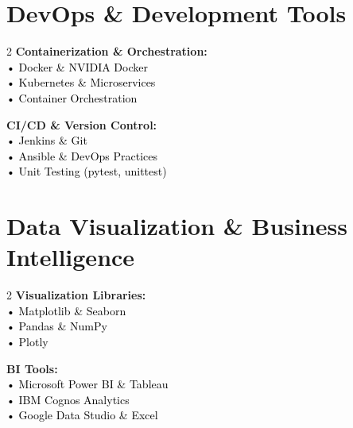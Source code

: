 \documentclass[10pt, letterpaper]{article}
\newcommand{\skillcat}[1]{%
    \textbf{\color{darkBlue}#1}%
}
\newcommand{\skillitem}[1]{%
    \textcolor{black}{#1}%
}
\begin{document}
\section{DevOps \& Development Tools}

\begin{tcolorbox}[colback=lightGray!50, colframe=accentColor, arc=3mm, boxrule=1pt]
\begin{multicols}{2}
\skillcat{Containerization \& Orchestration:} \\
\skillitem{• Docker \& NVIDIA Docker} \\
\skillitem{• Kubernetes \& Microservices} \\
\skillitem{• Container Orchestration} \\

\columnbreak

\skillcat{CI/CD \& Version Control:} \\
\skillitem{• Jenkins \& Git} \\
\skillitem{• Ansible \& DevOps Practices} \\
\skillitem{• Unit Testing (pytest, unittest)} \\
\end{multicols}
\end{tcolorbox}

\section{Data Visualization \& Business Intelligence}

\begin{tcolorbox}[colback=lightBlue!10, colframe=primaryColor, arc=3mm, boxrule=1pt]
\begin{multicols}{2}
\skillcat{Visualization Libraries:} \\
\skillitem{• Matplotlib \& Seaborn} \\
\skillitem{• Pandas \& NumPy} \\
\skillitem{• Plotly} \\

\columnbreak

\skillcat{BI Tools:} \\
\skillitem{• Microsoft Power BI \& Tableau} \\
\skillitem{• IBM Cognos Analytics} \\
\skillitem{• Google Data Studio \& Excel} \\
\end{multicols}
\end{tcolorbox}
\end{document}
